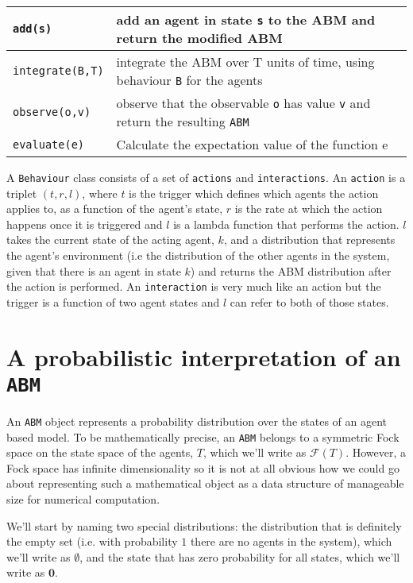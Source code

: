 \documentclass[letterpaper,twocolumn,10pt]{article}
\begin{document}
\begin{tabular}{|l|p{4.5cm}|}
\hline
\texttt{add(s)} & add an agent in state \texttt{s} to the ABM and return the modified ABM\\
\hline
\texttt{integrate(B,T)} & integrate the ABM over T units of time, using behaviour \texttt{B} for the agents\\
\hline
\texttt{observe(o,v)} & observe that the observable \texttt{o} has value \texttt{v} and return the resulting \texttt{ABM}\\
\hline
\texttt{evaluate(e)} & Calculate the expectation value of the function e\\ 
\hline
\end{tabular}

A \texttt{Behaviour} class consists of a set of \texttt{actions} and \texttt{interactions}. An \texttt{action} is a triplet $(t,r,l)$, where $t$ is the trigger which defines which agents the action applies to, as a function of the agent's state, $r$ is the rate at which the action happens once it is triggered and $l$ is a lambda function that performs the action. $l$ takes the current state of the acting agent, $k$, and a distribution that represents the agent's environment (i.e the distribution of the other agents in the system, given that there is an agent in state $k$) and returns the ABM distribution after the action is performed.  An \texttt{interaction} is very much like an action but the trigger is a function of two agent states and $l$ can refer to both of those states.

\section{A probabilistic interpretation of an \texttt{ABM}}

An \texttt{ABM} object represents a probability distribution over the states of an agent based model. To be mathematically precise, an \texttt{ABM} belongs to a symmetric Fock space on the state space of the agents, $T$, which we'll write as $\mathcal{F}(T)$. However, a Fock space has infinite dimensionality so it is not at all obvious how we could go about representing such a mathematical object as a data structure of manageable size for numerical computation.

We'll start by naming two special distributions: the distribution that is definitely the empty set (i.e. with probability $1$ there are no agents in the system), which we'll write as $\emptyset$, and the state that has zero probability for all states, which we'll write as $\mathbf{0}$.
\end{document}
